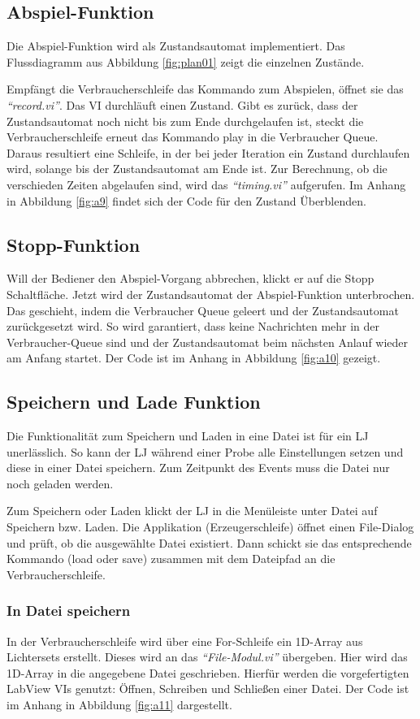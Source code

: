 \subsection{Abspiel-Funktion}
Die Abspiel-Funktion wird als Zustandsautomat implementiert. Das Flussdiagramm aus Abbildung \ref{fig:plan01} zeigt die einzelnen Zustände. 

Empfängt die Verbraucherschleife das Kommando zum Abspielen, öffnet sie das \textit{"`record.vi"'}. Das VI durchläuft einen Zustand. 
Gibt es zurück, dass der Zustandsautomat noch nicht bis zum Ende durchgelaufen ist, steckt die Verbraucherschleife erneut das Kommando play in die Verbraucher Queue. 
Daraus resultiert eine Schleife, in der bei jeder Iteration ein Zustand durchlaufen wird, solange bis der Zustandsautomat am Ende ist.
Zur Berechnung, ob die verschieden Zeiten abgelaufen sind, wird das  \textit{"`timing.vi"'} aufgerufen. 
Im Anhang in Abbildung \ref{fig:a9} findet sich der Code für den Zustand Überblenden.

\subsection{Stopp-Funktion}
Will der Bediener den Abspiel-Vorgang abbrechen, klickt er auf die Stopp Schaltfläche. Jetzt wird der Zustandsautomat der Abspiel-Funktion unterbrochen. 
Das geschieht, indem die Verbraucher Queue geleert und der Zustandsautomat zurückgesetzt wird. 
So wird garantiert, dass keine Nachrichten mehr in der Verbraucher-Queue sind und der Zustandsautomat beim nächsten Anlauf wieder am Anfang startet. 
Der Code ist im Anhang in Abbildung \ref{fig:a10} gezeigt.
		
		
\subsection{Speichern und Lade Funktion}
Die Funktionalität zum Speichern und Laden in eine Datei ist für ein LJ unerlässlich. 
So kann der LJ während einer Probe alle Einstellungen setzen und diese in einer Datei speichern. 
Zum Zeitpunkt des Events muss die Datei nur noch geladen werden. 

Zum Speichern oder Laden klickt der LJ in die Menüleiste unter Datei auf Speichern bzw. Laden. Die Applikation (Erzeugerschleife) öffnet einen File-Dialog 
und prüft, ob die ausgewählte Datei existiert. 
Dann schickt sie das entsprechende Kommando (load oder save) zusammen mit dem Dateipfad an die Verbraucherschleife.

\subsubsection{In Datei speichern}
In der Verbraucherschleife wird über eine For-Schleife ein 1D-Array aus Lichtersets erstellt. Dieses wird an das \textit{"`File-Modul.vi"'} übergeben. 
Hier wird das 1D-Array in die angegebene Datei geschrieben. 
Hierfür werden die vorgefertigten LabView VIs genutzt: Öffnen, Schreiben und Schließen einer Datei. Der Code ist im Anhang in Abbildung \ref{fig:a11} dargestellt.

